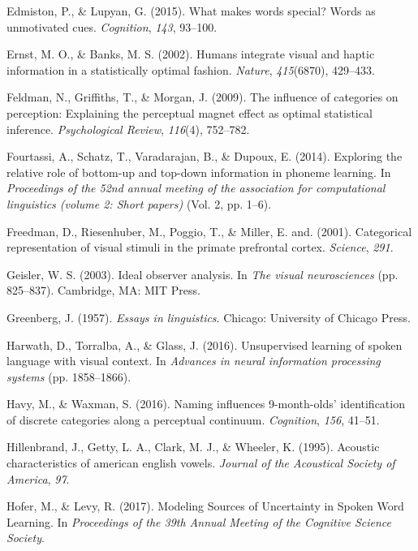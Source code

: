 \documentclass[english,,man,floatsintext]{apa6}
\theoremstyle{definition}
\theoremstyle{definition}
\theoremstyle{definition}
\theoremstyle{remark}
\begin{document}
\hypertarget{ref-edmiston2015}{}
Edmiston, P., \& Lupyan, G. (2015). What makes words special? Words as
unmotivated cues. \emph{Cognition}, \emph{143}, 93--100.

\hypertarget{ref-ernst02}{}
Ernst, M. O., \& Banks, M. S. (2002). Humans integrate visual and haptic
information in a statistically optimal fashion. \emph{Nature},
\emph{415}(6870), 429--433.

\hypertarget{ref-feldman2009}{}
Feldman, N., Griffiths, T., \& Morgan, J. (2009). The influence of
categories on perception: Explaining the perceptual magnet effect as
optimal statistical inference. \emph{Psychological Review},
\emph{116}(4), 752--782.

\hypertarget{ref-fourtassi2014b}{}
Fourtassi, A., Schatz, T., Varadarajan, B., \& Dupoux, E. (2014).
Exploring the relative role of bottom-up and top-down information in
phoneme learning. In \emph{Proceedings of the 52nd annual meeting of the
association for computational linguistics (volume 2: Short papers)}
(Vol. 2, pp. 1--6).

\hypertarget{ref-freedman2001}{}
Freedman, D., Riesenhuber, M., Poggio, T., \& Miller, E. and. (2001).
Categorical representation of visual stimuli in the primate prefrontal
cortex. \emph{Science}, \emph{291}.

\hypertarget{ref-Geisler2003}{}
Geisler, W. S. (2003). Ideal observer analysis. In \emph{The visual
neurosciences} (pp. 825--837). Cambridge, MA: MIT Press.

\hypertarget{ref-greenberg1957}{}
Greenberg, J. (1957). \emph{Essays in linguistics}. Chicago: University
of Chicago Press.

\hypertarget{ref-harwath2016}{}
Harwath, D., Torralba, A., \& Glass, J. (2016). Unsupervised learning of
spoken language with visual context. In \emph{Advances in neural
information processing systems} (pp. 1858--1866).

\hypertarget{ref-havy2016}{}
Havy, M., \& Waxman, S. (2016). Naming influences 9-month-olds'
identification of discrete categories along a perceptual continuum.
\emph{Cognition}, \emph{156}, 41--51.

\hypertarget{ref-hillenbrand1995}{}
Hillenbrand, J., Getty, L. A., Clark, M. J., \& Wheeler, K. (1995).
Acoustic characteristics of american english vowels. \emph{Journal of
the Acoustical Society of America}, \emph{97}.

\hypertarget{ref-hofer2017}{}
Hofer, M., \& Levy, R. (2017). Modeling Sources of Uncertainty in Spoken
Word Learning. In \emph{Proceedings of the 39th Annual Meeting of the
Cognitive Science Society}.
\end{document}
